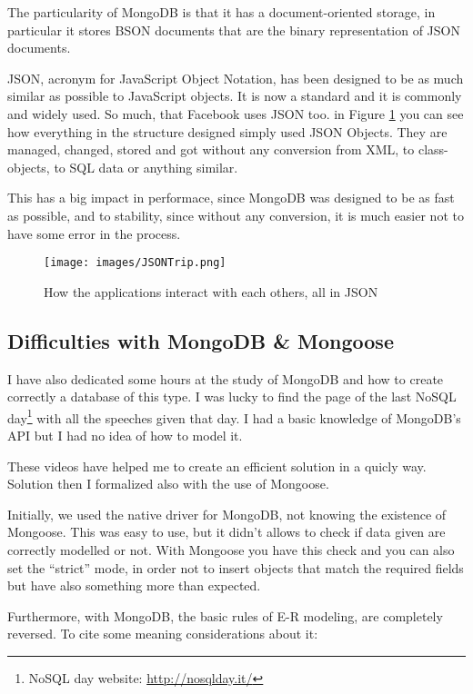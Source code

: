 The particularity of MongoDB is that it has a document-oriented storage, in particular it stores BSON documents that are the binary representation of JSON documents.

JSON, acronym for JavaScript Object Notation, has been designed to be as much similar as possible to JavaScript objects. It is now a standard and it is commonly and widely used. So much, that Facebook uses JSON too. in Figure \ref{fig:JSONTrip} you can see how everything in the structure designed simply used JSON Objects. They are managed, changed, stored and got without any conversion from XML, to class-objects, to SQL data or anything similar.

This has a big impact in performace, since MongoDB was designed to be as fast as possible, and to stability, since without any conversion, it is much easier not to have some error in the process.

\begin{figure}[H]
\centering %
\texttt{[image: images/JSONTrip.png]}
\caption{How the applications interact with each others, all in JSON}
\label{fig:JSONTrip}
\end{figure}

\subsection{Difficulties with MongoDB \& Mongoose}
I have also dedicated some hours at the study of MongoDB and how to create correctly a database of this type. I was lucky to find the page of the last NoSQL day\footnote{NoSQL day website: \url{http://nosqlday.it/}} with all the speeches given that day. I had a basic knowledge of MongoDB's API but I had no idea of how to model it.

These videos have helped me to create an efficient solution in a quicly way. Solution then I formalized also with the use of Mongoose.

Initially, we used the native driver for MongoDB, not knowing the existence of Mongoose. This was easy to use, but it didn't allows to check if data given are correctly modelled or not. With Mongoose you have this check and you can also set the ``strict'' mode, in order not to insert objects that match the required fields but have also something more than expected.

Furthermore, with MongoDB, the basic rules of E-R modeling, are completely reversed. To cite some meaning considerations about it:

